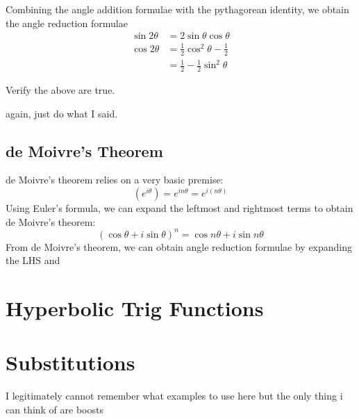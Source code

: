 Combining the angle addition formulae with the pythagorean identity, we obtain the angle reduction formulae
\begin{subequations}
	\begin{align}
		\sin2\theta &= 2\sin\theta\cos\theta\\
		\cos2\theta &= \frac{1}{2}\cos^2\theta - \frac{1}{2}\\
			    &=\frac{1}{2}-\frac{1}{2}\sin^2\theta
	\end{align}
\end{subequations}
\begin{exercise}
	Verify the above are true.
\begin{solution}
	again, just do what I said.
\end{solution}
\end{exercise}

\subsection{de Moivre's Theorem}
de Moivre's theorem relies on a very basic premise:
\[(e^{i\theta}) = e^{in\theta} = e^{i(n\theta)}\]
Using Euler's formula, we can expand the leftmost and rightmost terms to obtain de Moivre's theorem:
\begin{equation}
	\left(\cos\theta + i\sin\theta\right)^n = \cos n \theta + i\sin n\theta
\end{equation}
From de Moivre's theorem, we can obtain angle reduction formulae by expanding the LHS and 

\section{Hyperbolic Trig Functions}


\section{Substitutions}
I legitimately cannot remember what examples to use here but the only thing i can think of are boosts


